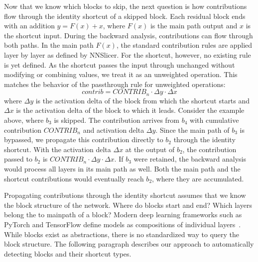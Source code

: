 \documentclass[
12pt,
fancyheadings,
a4paper,
twoside,
BCOR=0.7cm,
nobcorignoretitle,
grayscalebody,
]{stsreprt}
\begin{document}
Now that we know which blocks to skip, the next question is how contributions flow through the
identity shortcut of a skipped block.
Each residual block ends with an addition $y = F(x) + x$, where $F(x)$ is the main path output and
$x$ is the shortcut input.
During the backward analysis, contributions can flow through both paths.
In the main path $F(x)$, the standard contribution rules are applied layer by layer as defined by
NNSlicer.
For the shortcut, however, no existing rule is yet defined.
As the shortcut passes the input through unchanged without modifying or combining values, we treat
it as an unweighted operation.
This matches the behavior of the passthrough rule for unweighted operations:
\begin{equation}
    \textit{contrib} = \textit{CONTRIB}_n \cdot \Delta y \cdot \Delta x
\end{equation}
where $\Delta y$ is the activation delta of the block from which the shortcut starts and $\Delta x$
is the activation delta of the block to which it leads.
Consider the example above, where $b_3$ is skipped.
The contribution arrives from $b_4$ with cumulative contribution $\textit{CONTRIB}_n$ and
activation delta $\Delta y$.
Since the main path of $b_3$ is bypassed, we propagate this contribution directly to $b_2$ through
the identity shortcut.
With the activation delta $\Delta x$ at the output of $b_2$, the contribution passed to $b_2$ is
$\textit{CONTRIB}_n \cdot \Delta y \cdot \Delta x$.
If $b_3$ were retained, the backward analysis would process all layers in its main path as well.
Both the main path and the shortcut contributions would eventually reach $b_2$, where they are
accumulated.

Propagating contributions through the identity shortcut assumes that we know the block structure of
the network. Where do blocks start and end? Which layers belong the to mainpath of a block?
Modern deep learning frameworks such as PyTorch and TensorFlow define models as compositions of
individual layers~\cite{paszke2019pytorch, abadi2016tensorflow}.
While blocks exist as abstractions, there is no standardized way to query the block structure.
The following paragraph describes our approach to automatically detecting blocks and their shortcut
types.
\end{document}
